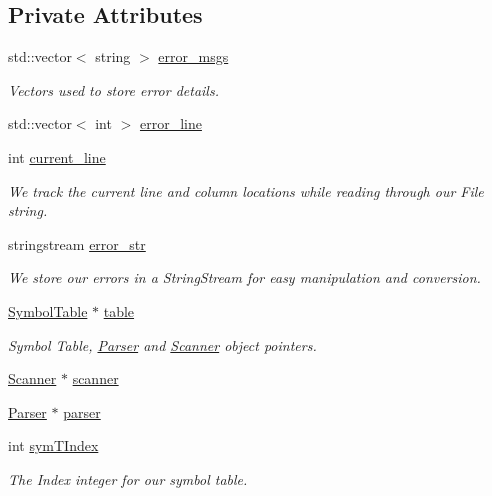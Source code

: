\subsection*{Private Attributes}
\begin{DoxyCompactItemize}
\item 
std::vector$<$ string $>$ \hyperlink{classAdmin_ad8c946fbb7ed32ad1f73a24eaf422c53}{error\_\-msgs}
\begin{DoxyCompactList}\small\item\em Vectors used to store error details. \item\end{DoxyCompactList}\item 
std::vector$<$ int $>$ \hyperlink{classAdmin_a2070f3b7ce2f309da1b080c3d3f07ecf}{error\_\-line}
\item 
int \hyperlink{classAdmin_a77039c04350669e25d604593a77bea36}{current\_\-line}
\begin{DoxyCompactList}\small\item\em We track the current line and column locations while reading through our File string. \item\end{DoxyCompactList}\item 
stringstream \hyperlink{classAdmin_ad5610f86befa3a43987ce15cfc389d28}{error\_\-str}
\begin{DoxyCompactList}\small\item\em We store our errors in a StringStream for easy manipulation and conversion. \item\end{DoxyCompactList}\item 
\hyperlink{classSymbolTable}{SymbolTable} $\ast$ \hyperlink{classAdmin_afb5161f047f166b985257447b9c47f22}{table}
\begin{DoxyCompactList}\small\item\em Symbol Table, \hyperlink{classParser}{Parser} and \hyperlink{classScanner}{Scanner} object pointers. \item\end{DoxyCompactList}\item 
\hyperlink{classScanner}{Scanner} $\ast$ \hyperlink{classAdmin_a6846c5ec5e565001a18a20167ff7b3cf}{scanner}
\item 
\hyperlink{classParser}{Parser} $\ast$ \hyperlink{classAdmin_a0fe59c6a08ae239bee02a58180fef8c3}{parser}
\item 
int \hyperlink{classAdmin_ae1c48226f950c3e470785785aff4d536}{symTIndex}
\begin{DoxyCompactList}\small\item\em The Index integer for our symbol table. \item\end{DoxyCompactList}\item 

\end{DoxyCompactItemize}
